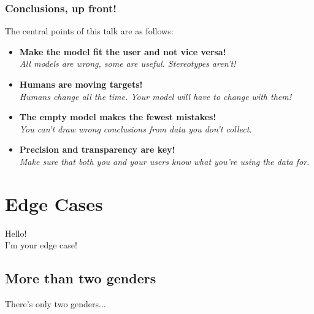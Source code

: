 \documentclass[aspectratio=169,x11names]{beamer}
\begin{document}
\begin{frame}
\frametitle{Conclusions, up front!}
\large
The central points of this talk are as follows:\bigskip

\begin{itemize}
\pause\item \textbf{Make the model fit the user and not vice versa!}\\
\emph{All models are wrong, some are useful. Stereotypes aren't!}\medskip
\pause\item \textbf{Humans are moving targets!}\\
\emph{Humans change all the time. Your model will have to change with them!}\medskip
\pause\item \textbf{The empty model makes the fewest mistakes!}\\
\emph{You can't draw wrong conclusions from data you don't collect.}\medskip
\pause\item \textbf{Precision and transparency are key!}\\
\emph{Make sure that both you and your users know what you're using the data for.}
\end{itemize}
\end{frame}


\section{Edge Cases}

\begin{frame}
\begin{center}
\huge
Hello!\\
I'm your edge case!
\end{center}
\end{frame}

\subsection{More than two genders}

\begin{frame}
\begin{center}
\huge
There's only two genders...
\end{center}
\end{frame}
\end{document}
